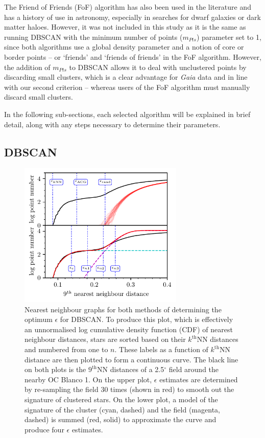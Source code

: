 The Friend of Friends (FoF) algorithm has also been used in the literature \citep{liu_catalog_2019} and has a history of use in astronomy, especially in searches for dwarf galaxies \citep[e.g.][]{duarte_how_2014} or dark matter haloes. However, it was not included in this study as it is the same as running DBSCAN with the minimum number of points ($m_{Pts}$) parameter set to 1, since both algorithms use a global density parameter and a notion of core or border points -- or `friends' and `friends of friends' in the FoF algorithm. However, the addition of $m_{Pts}$ to DBSCAN allows it to deal with unclustered points by discarding small clusters, which is a clear advantage for \emph{Gaia} data and in line with our second criterion -- whereas users of the FoF algorithm must manually discard small clusters.

In the following sub-sections, each selected algorithm will be explained in brief detail, along with any steps necessary to determine their parameters.


\subsection{DBSCAN}

\begin{figure}[t]
   \centering
   \includegraphics[width=0.7\textwidth]{fig/c2/fig_dbscan.pdf}
   \caption{Nearest neighbour graphs for both methods of determining the optimum $\epsilon$ for DBSCAN. To produce this plot, which is effectively an unnormalised log cumulative density function (CDF) of nearest neighbour distances, stars are sorted based on their $k^{\text{th}}$NN distances and numbered from one to $n$. These labels as a function of $k^{\text{th}}$NN distance are then plotted to form a continuous curve. The black line on both plots is the $9^{\text{th}}$NN distances of a 2.5$^\circ$ field around the nearby OC Blanco 1. On the upper plot, $\epsilon$ estimates are determined by re-sampling the field 30 times (shown in red) to smooth out the signature of clustered stars. On the lower plot, a model of the signature of the cluster (cyan, dashed) and the field (magenta, dashed) is summed (red, solid) to approximate the curve and produce four $\epsilon$ estimates.}\label{c2:fig:dbscan}%
\end{figure}

